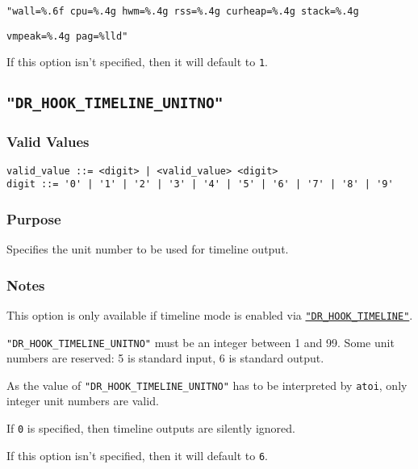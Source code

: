 \verb|"wall=%.6f cpu=%.4g hwm=%.4g rss=%.4g curheap=%.4g stack=%.4g|

\verb|vmpeak=%.4g pag=%lld"|

If this option isn't specified, then it will default to \verb|1|.



\subsection{\texttt{"DR\_HOOK\_TIMELINE\_UNITNO"}}
\label{section:flags:DR_HOOK_TIMELINE_UNITNO}
\vspace{-2ex}
\subsubsection{Valid Values}
\vspace{-2ex}
\verb+valid_value ::= <digit> | <valid_value> <digit>+ \\
\verb+digit ::= '0' | '1' | '2' | '3' | '4' | '5' | '6' | '7' | '8' | '9'+

\vspace{-2ex}
\subsubsection{Purpose}
\vspace{-2ex}
Specifies the unit number to be used for timeline output.

\vspace{-2ex}
\subsubsection{Notes}
\vspace{-2ex}
This option is only available if timeline mode is enabled via \hyperref[section:flags:DR_HOOK_TIMELINE]{\texttt{"DR\_HOOK\_TIMELINE"}}.

\texttt{"DR\_HOOK\_TIMELINE\_UNITNO"} must be an integer between 1 and 99. Some unit numbers are reserved: 5 is standard input, 6 is standard output.

As the value of \texttt{"DR\_HOOK\_TIMELINE\_UNITNO"} has to be interpreted by \texttt{atoi}, only integer unit numbers are valid.

If \verb|0| is specified, then timeline outputs are silently ignored.

If this option isn't specified, then it will default to \verb|6|.


